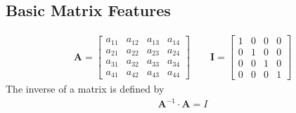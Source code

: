\documentclass[letterpaper,10pt,english]{sphinxmanual}
\begin{document}
\subsection{Basic Matrix Features}
\label{\detokenize{chapter2:basic-matrix-features}}
\begin{equation*}
\begin{split}
\mathbf{A} =
      \begin{bmatrix} a_{11} & a_{12} & a_{13} & a_{14} \\
                                 a_{21} & a_{22} & a_{23} & a_{24} \\
                                   a_{31} & a_{32} & a_{33} & a_{34} \\
                                  a_{41} & a_{42} & a_{43} & a_{44}
             \end{bmatrix}\qquad
\mathbf{I} =
      \begin{bmatrix} 1 & 0 & 0 & 0 \\
                                 0 & 1 & 0 & 0 \\
                                 0 & 0 & 1 & 0 \\
                                 0 & 0 & 0 & 1
             \end{bmatrix}
\end{split}
\end{equation*}
The inverse of a matrix is defined by
\begin{equation*}
\begin{split}
\mathbf{A}^{-1} \cdot \mathbf{A} = I
\end{split}
\end{equation*}
\end{document}
